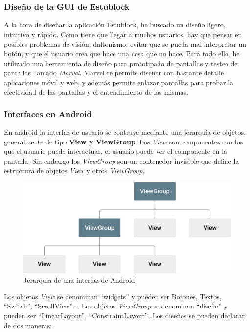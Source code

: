 \subsubsection{Diseño de la GUI de Estublock}

A la hora de diseñar la aplicación Estublock, he buscado un diseño ligero, intuitivo y rápido. Como tiene que llegar a muchos usuarios, hay que pensar en posibles problemas de visión, daltonismo, evitar que se pueda mal interpretar un botón, y que el usuario crea que hace una cosa que no hace. Para todo ello, he utilizado una herramienta de diseño para prototipado de pantallas y testeo de pantallas llamado \emph{Marvel}\cite{marvelapp}. Marvel te permite diseñar con bastante detalle aplicaciones móvil y web, y además permite enlazar pantallas para probar la efectividad de las pantallas y el entendimiento de las mismas.

\subsubsection{Interfaces en Android}

En android la interfaz de usuario se contruye mediante una jerarquía de objetos, generalmente de tipo \textbf{View y ViewGroup}. Los \emph{View} son componentes con los que el usuario puede interactuar, el usuario puede ver el componente en la pantalla. Sin embargo los \emph{ViewGroup} son un contenedor invisible que define la estructura de objetos \emph{View} y otros \emph{ViewGroup}.

\begin{figure}[h!]
  \centering
  \includegraphics[width=0.6\linewidth]{figs/Desarrollo/Jerarquia}
  \caption[Android Layout]{Jerarquia de una interfaz de Android}
  \label{fig:interfaz_android}
\end{figure}

Los objetos \emph{View} se denominan ``widgets'' y pueden ser Botones, Textos, ``Switch'', ``ScrollView''\dots. Los objetos \emph{ViewGroup} se denominan ``diseño'' y pueden ser ``LinearLayout'', ``ConstraintLayout''\dots Los diseños se pueden declarar de dos maneras: \\

